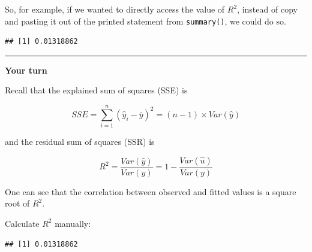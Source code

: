 \documentclass[]{book}
\newenvironment{Shaded}{\begin{snugshade}}{\end{snugshade}}
\newcommand{\DecValTok}[1]{\textcolor[rgb]{0.00,0.00,0.81}{#1}}
\newcommand{\KeywordTok}[1]{\textcolor[rgb]{0.13,0.29,0.53}{\textbf{#1}}}
\newcommand{\NormalTok}[1]{#1}
\newcommand{\OperatorTok}[1]{\textcolor[rgb]{0.81,0.36,0.00}{\textbf{#1}}}
\newcommand{\StringTok}[1]{\textcolor[rgb]{0.31,0.60,0.02}{#1}}
\begin{document}
So, for example, if we wanted to directly access the value of \(R^2\),
instead of copy and pasting it out of the printed statement from
\texttt{summary()}, we could do so.

\begin{Shaded}
\end{Shaded}

\begin{verbatim}
## [1] 0.01318862
\end{verbatim}

\begin{center}\rule{0.5\linewidth}{\linethickness}\end{center}

\textbf{Your turn}

Recall that the explained sum of squares (SSE) is

\begin{equation}
SSE = \sum_{i=1}^{n}(\hat{y}_{i} - \bar{y})^2 = (n-1) \times Var(\hat{y})
\label{eq:SSE}
\end{equation}

and the residual sum of squares (SSR) is

\begin{equation}
R^2 = \frac{Var(\hat{y})}{Var(y)} = 1 - \frac{Var(\hat{u})}{Var(y)} 
\label{eq:SSR}
\end{equation}

One can see that the correlation between observed and fitted values is a
square root of \(R^2\).

Calculate \(R^2\) manually:

\begin{Shaded}
\end{Shaded}

\begin{verbatim}
## [1] 0.01318862
\end{verbatim}

\begin{Shaded}
\end{Shaded}
\end{document}
